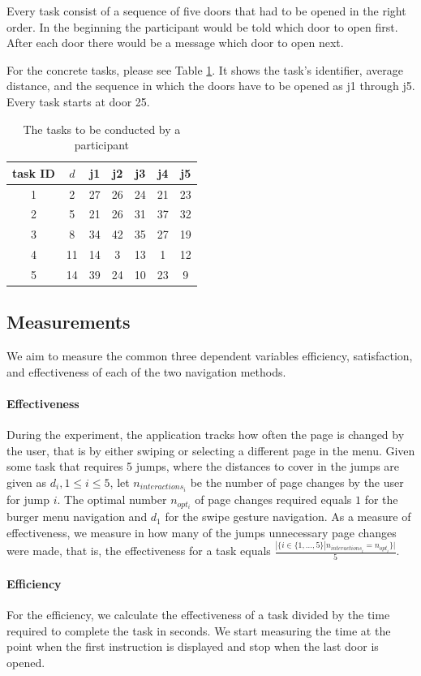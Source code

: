 \documentclass{sig-alternate-05-2015}
\begin{document}
Every task consist of a sequence of five doors that had to be opened in the right order. In the beginning the participant would be told which door to open first. After each door there would be a message which door to open next.

For the concrete tasks, please see Table \ref{tab:tasks}. It shows the task's identifier, average distance, and the sequence in which the doors have to be opened as j1 through j5. Every task starts at door 25.
\begin{table}[!h]
\centering
\caption{The tasks to be conducted by a participant}
\label{tab:tasks}
\begin{tabular}{|c|c|c|c|c|c|c|}
\toprule
task ID & $d$ & j1 & j2 & j3 & j4 & j5 \\
\midrule 1 & 2 & 27 & 26 & 24 & 21 & 23 \\
\midrule 2 & 5 & 21 & 26 & 31 & 37 & 32 \\
\midrule 3 & 8 & 34 & 42 & 35 & 27 & 19 \\
\midrule 4 & 11 & 14 & 3 & 13 & 1 & 12 \\
\midrule 5 & 14 & 39 & 24 & 10 & 23 & 9 \\
\bottomrule
\end{tabular}
\end{table}
\subsection{Measurements}\label{chap:measurements}
\label{sec:measurements}
We aim to measure the common three dependent variables efficiency, satisfaction, and effectiveness of each of the two navigation methods.
\paragraph{Effectiveness}
During the experiment, the application tracks how often the page is changed by the user, that is by either swiping or selecting a different page in the menu. 
Given some task that requires 5 jumps, where the distances to cover in the jumps are given as $d_i, 1 \leq i \leq 5$, let $n_{interactions_i}$ be the number
of page changes by the user for jump $i$.
The optimal number $n_{opt_i}$ of
page changes required equals $1$ for the burger menu navigation and $d_1$ for the swipe gesture navigation. As a measure of 
effectiveness, we measure in how many of the jumps unnecessary page changes were made, that is, the effectiveness for a task
equals $\frac{|\{i \in \{1,\ldots,5\} | n_{interactions_i} = n_{opt_i} \}|}{5}$.
\paragraph{Efficiency} For the efficiency, we calculate the effectiveness of a task divided by the time 
required to complete the task in seconds. We start measuring the time at the point
when the first instruction is displayed and stop when the last door is opened.
\end{document}
